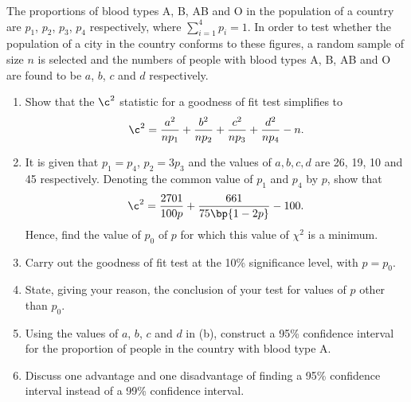 \begin{problem}
    The proportions of blood types A, B, AB and O in the population of a country are $p_1$, $p_2$, $p_3$, $p_4$ respectively, where $\sum_{i=1}^4 p_i = 1$. In order to test whether the population of a city in the country conforms to these figures, a random sample of size $n$ is selected and the numbers of people with blood types A, B, AB and O are found to be $a$, $b$, $c$ and $d$ respectively.

    \begin{enumerate}
        \item Show that the $\c^2$ statistic for a goodness of fit test simplifies to \[\c^2 = \frac{a^2}{np_1} + \frac{b^2}{np_2} + \frac{c^2}{np_3} + \frac{d^2}{np_4} - n.\]
        \item It is given that $p_1 = p_4$, $p_2 = 3p_3$ and the values of $a, b, c, d$ are 26, 19, 10 and 45 respectively. Denoting the common value of $p_1$ and $p_4$ by $p$, show that \[\c^2 = \frac{2701}{100p} + \frac{661}{75\bp{1 - 2p}} - 100.\] Hence, find the value of $p_0$ of $p$ for which this value of $\chi^2$ is a minimum. 
        \item Carry out the goodness of fit test at the 10\% significance level, with $p = p_0$.
        \item State, giving your reason, the conclusion of your test for values of $p$ other than $p_0$.
        \item Using the values of $a$, $b$, $c$ and $d$ in (b), construct a 95\% confidence interval for the proportion of people in the country with blood type A.
        \item Discuss one advantage and one disadvantage of finding a 95\% confidence interval instead of a 99\% confidence interval.
    \end{enumerate}
\end{problem}
